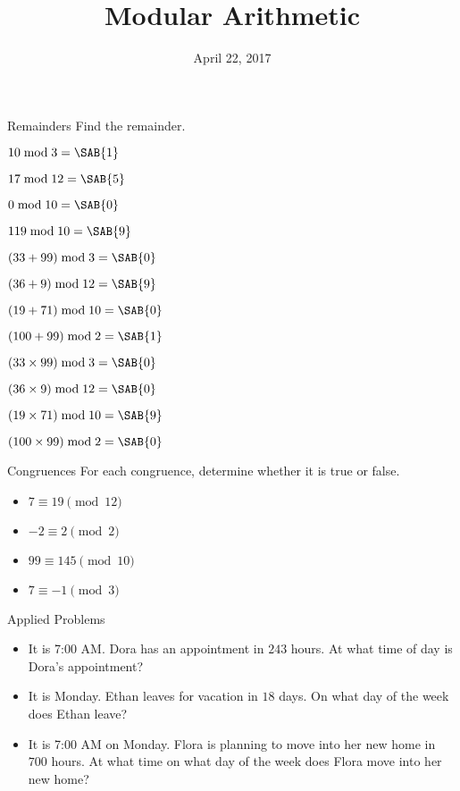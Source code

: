 \documentclass[12pt,letterpaper]{article}
\title{Modular Arithmetic}
\date{April 22, 2017}
\begin{document}
\maketitle

\thispagestyle{empty}

\begin{problem}{Remainders}
 Find the remainder.

 \begin{itemize}
  \begin{multicols}{2}
   \item \(10 \bmod 3 = \SAB{1}\)
   \item \(17 \bmod 12 = \SAB{5}\)
   \item \(0 \bmod 10 = \SAB{0}\)
   \item \(119 \bmod 10 = \SAB{9}\)
   \item \((33 + 99) \bmod 3 = \SAB{0}\)
   \item \((36 + 9) \bmod 12 = \SAB{9}\)
   \item \((19 + 71) \bmod 10 = \SAB{0}\)
   \item \((100 + 99) \bmod 2 = \SAB{1}\)
   \item \((33 \times 99) \bmod 3 = \SAB{0}\)
   \item \((36 \times 9) \bmod 12 = \SAB{0}\)
   \item \((19 \times 71) \bmod 10 = \SAB{9}\)
   \item \((100 \times 99) \bmod 2 = \SAB{0}\)
  \end{multicols}
 \end{itemize}
\end{problem}

\begin{problem}{Congruences}
 For each congruence, determine whether it is true or false.

 \begin{itemize}
   \item \(7 \equiv 19 \pmod {12}\) \hfill \TFTrue
   \item \(-2 \equiv 2 \pmod {2}\) \hfill \TFTrue
   \item \(99 \equiv 145 \pmod {10}\) \hfill \TFFalse
   \item \(7 \equiv -1 \pmod {3}\) \hfill \TFFalse
 \end{itemize}
\end{problem}

\begin{problem}{Applied Problems}

 \begin{itemize}
  \item It is 7:00 AM. Dora has an appointment in \(243\) hours. At what time of
  day is Dora's appointment? 
  \item It is Monday. Ethan leaves for vacation in \(18\) days. On what day of the
  week does Ethan leave? 
  \item It is 7:00 AM on Monday. Flora is planning to move into her new home in
  \(700\) hours. At what time on what day of the week does Flora move into her new
  home? 
 \end{itemize}
\end{problem}
\end{document}
